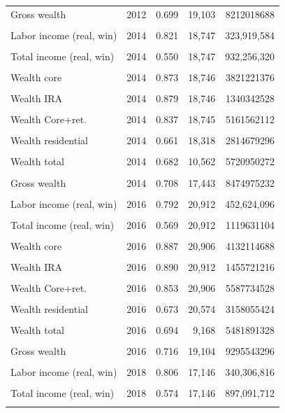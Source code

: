 \begin{table}[htbp]
\begin{tabular}{llrrr}
Gross wealth & 2012 & 0.699 & 19,103 & 8212018688 \\\\
Labor income (real, win) & 2014 & 0.821 & 18,747 & 323,919,584 \\\\
Total income (real, win) & 2014 & 0.550 & 18,747 & 932,256,320 \\\\
Wealth core & 2014 & 0.873 & 18,746 & 3821221376 \\\\
Wealth IRA & 2014 & 0.879 & 18,746 & 1340342528 \\\\
Wealth Core+ret. & 2014 & 0.837 & 18,745 & 5161562112 \\\\
Wealth residential & 2014 & 0.661 & 18,318 & 2814679296 \\\\
Wealth total & 2014 & 0.682 & 10,562 & 5720950272 \\\\
Gross wealth & 2014 & 0.708 & 17,443 & 8474975232 \\\\
Labor income (real, win) & 2016 & 0.792 & 20,912 & 452,624,096 \\\\
Total income (real, win) & 2016 & 0.569 & 20,912 & 1119631104 \\\\
Wealth core & 2016 & 0.887 & 20,906 & 4132114688 \\\\
Wealth IRA & 2016 & 0.890 & 20,912 & 1455721216 \\\\
Wealth Core+ret. & 2016 & 0.853 & 20,906 & 5587734528 \\\\
Wealth residential & 2016 & 0.673 & 20,574 & 3158055424 \\\\
Wealth total & 2016 & 0.694 & 9,168 & 5481891328 \\\\
Gross wealth & 2016 & 0.716 & 19,104 & 9295543296 \\\\
Labor income (real, win) & 2018 & 0.806 & 17,146 & 340,306,816 \\\\
Total income (real, win) & 2018 & 0.574 & 17,146 & 897,091,712 \\\\

\end{tabular}
\end{table}
